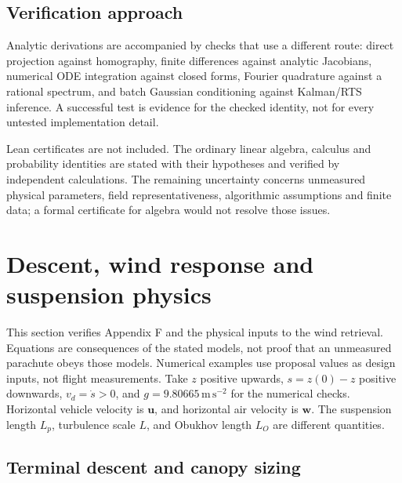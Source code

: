 \documentclass[11pt,a4paper]{article}
\numberwithin{equation}{section}
\begin{document}
\subsection{Verification approach}
Analytic derivations are accompanied by checks that use a different route: direct projection against homography, finite differences against analytic Jacobians, numerical ODE integration against closed forms, Fourier quadrature against a rational spectrum, and batch Gaussian conditioning against Kalman/RTS inference. A successful test is evidence for the checked identity, not for every untested implementation detail.

Lean certificates are not included. The ordinary linear algebra, calculus and probability identities are stated with their hypotheses and verified by independent calculations. The remaining uncertainty concerns unmeasured physical parameters, field representativeness, algorithmic assumptions and finite data; a formal certificate for algebra would not resolve those issues.
\clearpage


\section{Descent, wind response and suspension physics}
\label{sec:physics}

This section verifies Appendix F and the physical inputs to the wind
retrieval. Equations are consequences of the stated models, not proof that
an unmeasured parachute obeys those models. Numerical examples use proposal
values as design inputs, not flight measurements. Take $z$ positive upwards,
$s=z(0)-z$ positive downwards, $v_d=\dot s>0$, and
$g=9.80665\,\mathrm{m\,s^{-2}}$ for the numerical checks. Horizontal vehicle
velocity is $\boldsymbol u$, and horizontal air velocity is $\boldsymbol w$.
The suspension length $L_p$, turbulence scale $L$, and Obukhov length $L_O$
are different quantities.

\subsection{Terminal descent and canopy sizing}
\end{document}

